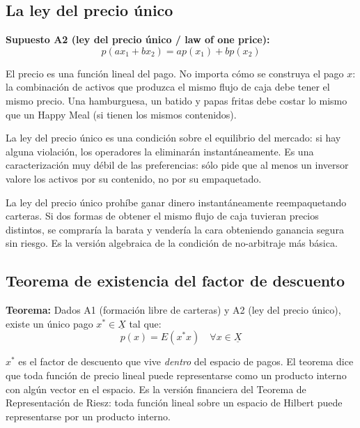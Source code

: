 \documentclass[12pt]{article}
\begin{document}
\subsection{La ley del precio \'unico}

\textbf{Supuesto A2 (ley del precio \'unico / law of one price):}
\begin{equation}
    p(ax_1 + bx_2) = ap(x_1) + bp(x_2)
\end{equation}

\begin{intuicionmat}
El precio es una funci\'on lineal del pago. No importa c\'omo se construya el pago $x$: la combinaci\'on de activos que produzca el mismo flujo de caja debe tener el mismo precio. Una hamburguesa, un batido y papas fritas debe costar lo mismo que un Happy Meal (si tienen los mismos contenidos).
\end{intuicionmat}

La ley del precio \'unico es una condici\'on sobre el equilibrio del mercado: si hay alguna violaci\'on, los operadores la eliminar\'an instant\'aneamente. Es una caracterizaci\'on muy d\'ebil de las preferencias: s\'olo pide que al menos un inversor valore los activos por su contenido, no por su empaquetado.

\begin{intuicion}
La ley del precio \'unico proh\'ibe ganar dinero instant\'aneamente reempaquetando carteras. Si dos formas de obtener el mismo flujo de caja tuvieran precios distintos, se comprar\'ia la barata y vender\'ia la cara obteniendo ganancia segura sin riesgo. Es la versi\'on algebraica de la condici\'on de no-arbitraje m\'as b\'asica.
\end{intuicion}

\subsection{Teorema de existencia del factor de descuento}

\textbf{Teorema:} Dados A1 (formaci\'on libre de carteras) y A2 (ley del precio \'unico), existe un \'unico pago $x^* \in \underline{X}$ tal que:
\begin{equation}
    p(x) = E(x^* x) \quad \forall x \in \underline{X}
\end{equation}

\begin{intuicionmat}
$x^*$ es el factor de descuento que vive \emph{dentro} del espacio de pagos. El teorema dice que toda funci\'on de precio lineal puede representarse como un producto interno con alg\'un vector en el espacio. Es la versi\'on financiera del Teorema de Representaci\'on de Riesz: toda funci\'on lineal sobre un espacio de Hilbert puede representarse por un producto interno.
\end{intuicionmat}
\end{document}
